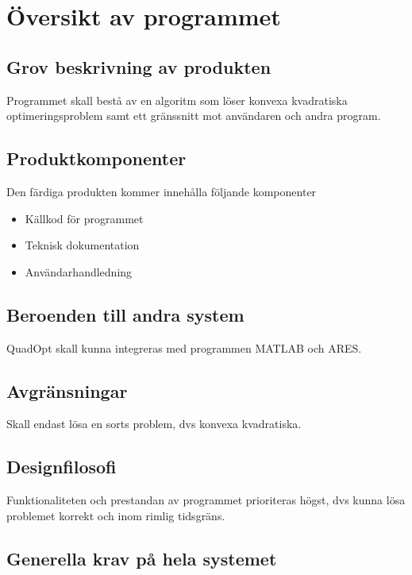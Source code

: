 \section{Översikt av programmet}

\subsection{Grov beskrivning av produkten}
Programmet skall bestå av en algoritm som löser konvexa kvadratiska optimeringsproblem samt ett gränssnitt mot användaren och andra program.      

\subsection{Produktkomponenter}
Den färdiga produkten kommer innehålla följande komponenter
\begin{itemize}
\item{Källkod för programmet}
\item{Teknisk dokumentation}
\item{Användarhandledning}
\end{itemize}

\subsection{Beroenden till andra system}
QuadOpt skall kunna integreras med programmen MATLAB och ARES.

\subsection{Avgränsningar}
Skall endast lösa en sorts problem, dvs konvexa kvadratiska. 

\subsection{Designfilosofi}
Funktionaliteten och prestandan av programmet prioriteras högst, dvs kunna lösa problemet korrekt och inom rimlig tidsgräns. 

\subsection{Generella krav på hela systemet}


